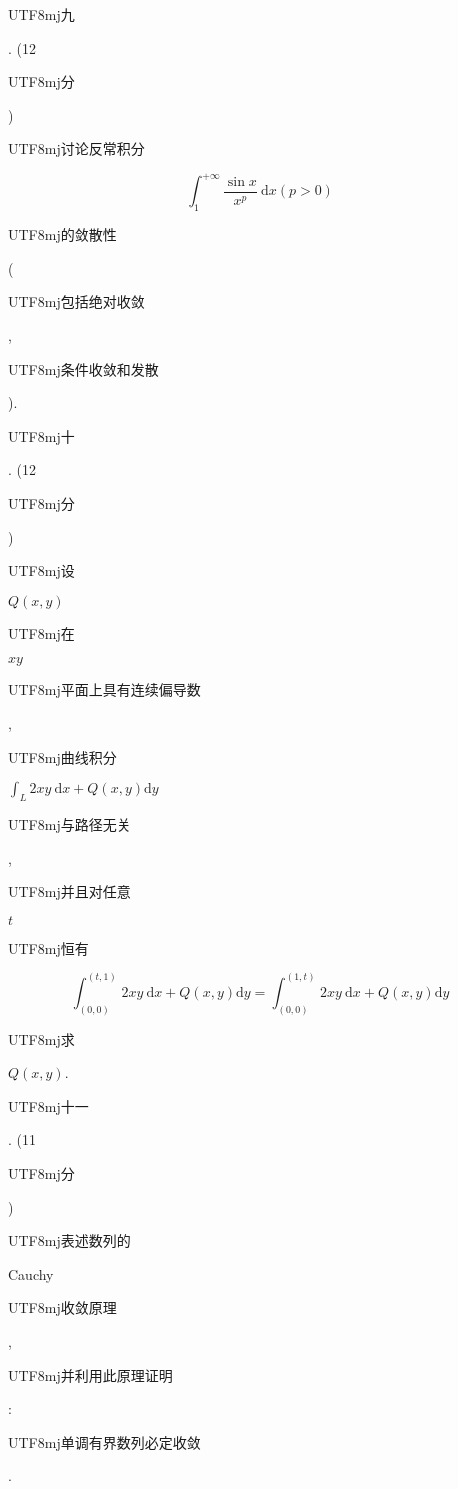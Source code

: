 \documentclass[10pt]{article}
\begin{document}
\begin{CJK}{UTF8}{mj}九\end{CJK}. (12 \begin{CJK}{UTF8}{mj}分\end{CJK}) \begin{CJK}{UTF8}{mj}讨论反常积分\end{CJK}
$$
\int_{1}^{+\infty} \frac{\sin x}{x^{p}} \mathrm{~d} x(p>0)
$$
\begin{CJK}{UTF8}{mj}的敛散性\end{CJK} (\begin{CJK}{UTF8}{mj}包括绝对收敛\end{CJK}, \begin{CJK}{UTF8}{mj}条件收敛和发散\end{CJK}). \begin{CJK}{UTF8}{mj}十\end{CJK}. (12 \begin{CJK}{UTF8}{mj}分\end{CJK}) \begin{CJK}{UTF8}{mj}设\end{CJK} $Q(x, y)$ \begin{CJK}{UTF8}{mj}在\end{CJK} $x y$ \begin{CJK}{UTF8}{mj}平面上具有连续偏导数\end{CJK}, \begin{CJK}{UTF8}{mj}曲线积分\end{CJK} $\int_{L} 2 x y \mathrm{~d} x+Q(x, y) \mathrm{d} y$ \begin{CJK}{UTF8}{mj}与路径无关\end{CJK}, \begin{CJK}{UTF8}{mj}并且对任意\end{CJK} $t$ \begin{CJK}{UTF8}{mj}恒有\end{CJK}
$$
\int_{(0,0)}^{(t, 1)} 2 x y \mathrm{~d} x+Q(x, y) \mathrm{d} y=\int_{(0,0)}^{(1, t)} 2 x y \mathrm{~d} x+Q(x, y) \mathrm{d} y
$$
\begin{CJK}{UTF8}{mj}求\end{CJK} $Q(x, y)$.

\begin{CJK}{UTF8}{mj}十一\end{CJK}. (11 \begin{CJK}{UTF8}{mj}分\end{CJK}) \begin{CJK}{UTF8}{mj}表述数列的\end{CJK} Cauchy \begin{CJK}{UTF8}{mj}收敛原理\end{CJK}, \begin{CJK}{UTF8}{mj}并利用此原理证明\end{CJK}: \begin{CJK}{UTF8}{mj}单调有界数列必定收敛\end{CJK}.
\end{document}
